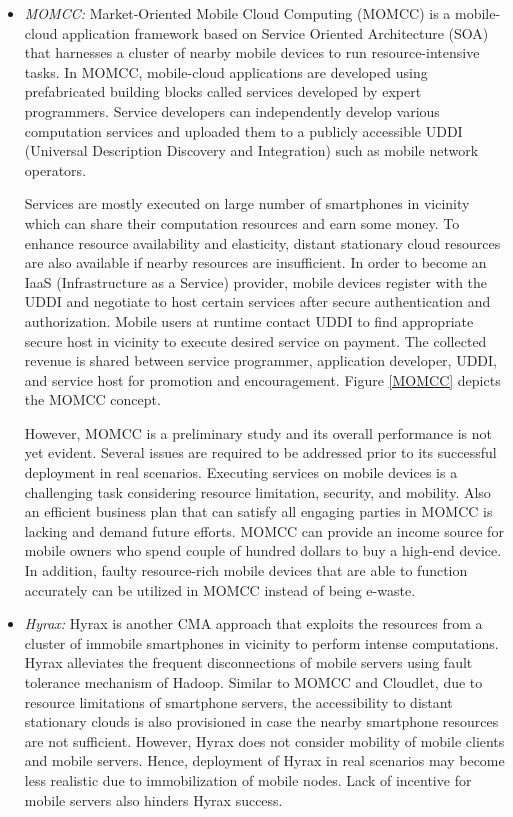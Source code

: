 \documentclass[publish]{IEEEtran}
\begin{document}
\begin{itemize}
\item \textit{MOMCC:}
Market-Oriented Mobile Cloud Computing (MOMCC) \cite{MOMCC} is a mobile-cloud application framework based on Service Oriented Architecture (SOA) that harnesses a cluster of nearby mobile devices to run resource-intensive tasks. In MOMCC, mobile-cloud applications are developed using prefabricated building blocks called services developed by expert programmers. Service developers can independently develop various computation services and uploaded them to a publicly accessible UDDI (Universal Description Discovery and Integration) such as mobile network operators.

Services are mostly executed on large number of smartphones in vicinity which can share their computation resources and earn some money. To enhance resource availability and elasticity, distant stationary cloud resources are also available if nearby resources are insufficient. In order to become an IaaS (Infrastructure as a Service) provider, mobile devices register with the UDDI and negotiate to host certain services after secure authentication and authorization. Mobile users at runtime contact UDDI to find appropriate secure host in vicinity to execute desired service on payment. The collected revenue is shared between service programmer, application developer, UDDI, and service host for promotion and encouragement. Figure \ref{MOMCC} depicts the MOMCC concept.

However, MOMCC is a preliminary study and its overall performance is not yet evident. Several issues are required to be addressed prior to its successful deployment in real scenarios. Executing services on mobile devices is a challenging task considering resource limitation, security, and mobility. Also an efficient business plan that can satisfy all engaging parties in MOMCC is lacking and demand future efforts. MOMCC can provide an income source for mobile owners who spend couple of hundred dollars to buy a high-end device. In addition, faulty resource-rich mobile devices that are able to function accurately can be utilized in MOMCC instead of being e-waste.

\item \textit{Hyrax:}
Hyrax \cite{hyrax} is another CMA approach that exploits the resources from a cluster of immobile smartphones in vicinity to perform intense computations. Hyrax alleviates the frequent disconnections of mobile servers using fault tolerance mechanism of Hadoop. Similar to MOMCC and Cloudlet, due to resource limitations of smartphone servers, the accessibility to distant stationary clouds is also provisioned in case the nearby smartphone resources are not sufficient. However, Hyrax does not consider mobility of mobile clients and mobile servers. Hence, deployment of Hyrax in real scenarios may become less realistic due to immobilization of mobile nodes. Lack of incentive for mobile servers also hinders Hyrax success. 


\end{itemize}
\end{document}
